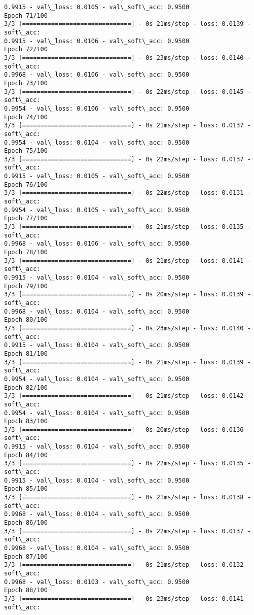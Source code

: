 \documentclass[11pt]{article}
\begin{document}
\begin{Verbatim}[commandchars=\\\{\}]
0.9915 - val\_loss: 0.0105 - val\_soft\_acc: 0.9500
Epoch 71/100
3/3 [==============================] - 0s 21ms/step - loss: 0.0139 - soft\_acc:
0.9915 - val\_loss: 0.0106 - val\_soft\_acc: 0.9500
Epoch 72/100
3/3 [==============================] - 0s 23ms/step - loss: 0.0140 - soft\_acc:
0.9968 - val\_loss: 0.0106 - val\_soft\_acc: 0.9500
Epoch 73/100
3/3 [==============================] - 0s 22ms/step - loss: 0.0145 - soft\_acc:
0.9954 - val\_loss: 0.0106 - val\_soft\_acc: 0.9500
Epoch 74/100
3/3 [==============================] - 0s 21ms/step - loss: 0.0137 - soft\_acc:
0.9954 - val\_loss: 0.0104 - val\_soft\_acc: 0.9500
Epoch 75/100
3/3 [==============================] - 0s 22ms/step - loss: 0.0137 - soft\_acc:
0.9915 - val\_loss: 0.0105 - val\_soft\_acc: 0.9500
Epoch 76/100
3/3 [==============================] - 0s 22ms/step - loss: 0.0131 - soft\_acc:
0.9954 - val\_loss: 0.0105 - val\_soft\_acc: 0.9500
Epoch 77/100
3/3 [==============================] - 0s 21ms/step - loss: 0.0135 - soft\_acc:
0.9968 - val\_loss: 0.0106 - val\_soft\_acc: 0.9500
Epoch 78/100
3/3 [==============================] - 0s 21ms/step - loss: 0.0141 - soft\_acc:
0.9915 - val\_loss: 0.0104 - val\_soft\_acc: 0.9500
Epoch 79/100
3/3 [==============================] - 0s 20ms/step - loss: 0.0139 - soft\_acc:
0.9968 - val\_loss: 0.0104 - val\_soft\_acc: 0.9500
Epoch 80/100
3/3 [==============================] - 0s 23ms/step - loss: 0.0140 - soft\_acc:
0.9915 - val\_loss: 0.0104 - val\_soft\_acc: 0.9500
Epoch 81/100
3/3 [==============================] - 0s 21ms/step - loss: 0.0139 - soft\_acc:
0.9954 - val\_loss: 0.0104 - val\_soft\_acc: 0.9500
Epoch 82/100
3/3 [==============================] - 0s 21ms/step - loss: 0.0142 - soft\_acc:
0.9954 - val\_loss: 0.0104 - val\_soft\_acc: 0.9500
Epoch 83/100
3/3 [==============================] - 0s 20ms/step - loss: 0.0136 - soft\_acc:
0.9915 - val\_loss: 0.0104 - val\_soft\_acc: 0.9500
Epoch 84/100
3/3 [==============================] - 0s 22ms/step - loss: 0.0135 - soft\_acc:
0.9915 - val\_loss: 0.0104 - val\_soft\_acc: 0.9500
Epoch 85/100
3/3 [==============================] - 0s 21ms/step - loss: 0.0138 - soft\_acc:
0.9968 - val\_loss: 0.0104 - val\_soft\_acc: 0.9500
Epoch 86/100
3/3 [==============================] - 0s 22ms/step - loss: 0.0137 - soft\_acc:
0.9968 - val\_loss: 0.0104 - val\_soft\_acc: 0.9500
Epoch 87/100
3/3 [==============================] - 0s 21ms/step - loss: 0.0132 - soft\_acc:
0.9968 - val\_loss: 0.0103 - val\_soft\_acc: 0.9500
Epoch 88/100
3/3 [==============================] - 0s 23ms/step - loss: 0.0141 - soft\_acc:

\end{Verbatim}
\end{document}
